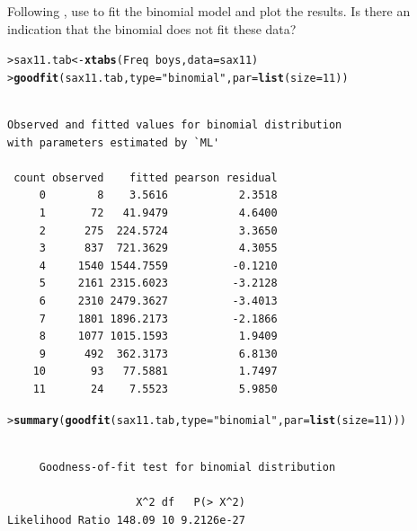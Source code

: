 \documentclass[10pt]{report}\usepackage[]{graphicx}\usepackage[]{color}
\makeatletter
\newcommand{\hlnum}[1]{\textcolor[rgb]{0.686,0.059,0.569}{#1}}%
\newcommand{\hlstr}[1]{\textcolor[rgb]{0.192,0.494,0.8}{#1}}%
\newcommand{\hlopt}[1]{\textcolor[rgb]{0,0,0}{#1}}%
\newcommand{\hlstd}[1]{\textcolor[rgb]{0.345,0.345,0.345}{#1}}%
\newcommand{\hlkwb}[1]{\textcolor[rgb]{0.69,0.353,0.396}{#1}}%
\newcommand{\hlkwc}[1]{\textcolor[rgb]{0.333,0.667,0.333}{#1}}%
\newcommand{\hlkwd}[1]{\textcolor[rgb]{0.737,0.353,0.396}{\textbf{#1}}}%
\newenvironment{kframe}{%
 \def\at@end@of@kframe{}%
 \ifinner\ifhmode%
  \def\at@end@of@kframe{\end{minipage}}%
  \begin{minipage}{\columnwidth}%
 \fi\fi%
 \def\FrameCommand##1{\hskip\@totalleftmargin \hskip-\fboxsep
 \colorbox{shadecolor}{##1}\hskip-\fboxsep
     \hskip-\linewidth \hskip-\@totalleftmargin \hskip\columnwidth}%
 \MakeFramed {\advance\hsize-\width
   \@totalleftmargin\z@ \linewidth\hsize
   \@setminipage}}%
 {\par\unskip\endMakeFramed%
 \at@end@of@kframe}
\newenvironment{knitrout}{}{} %
\renewenvironment{knitrout}{\small\renewcommand{\baselinestretch}{.85}}{} %
\makeatother
\begin{document}
\begin{Exercises}
\begin{enumerate*}
    \item Following , use  to fit the binomial model and plot the
    results.  Is there an indication that the binomial does not fit these data?
    \begin{ans}
\begin{knitrout}\footnotesize
{}\color{fgcolor}\begin{kframe}
\begin{alltt}
\hlstd{> }\hlstd{sax11.tab} \hlkwb{<-} \hlkwd{xtabs}\hlstd{(Freq} \hlopt{~} \hlstd{boys,} \hlkwc{data}\hlstd{=sax11)}
\hlstd{> }\hlkwd{goodfit}\hlstd{(sax11.tab,} \hlkwc{type}\hlstd{=}\hlstr{"binomial"}\hlstd{,} \hlkwc{par}\hlstd{=}\hlkwd{list}\hlstd{(}\hlkwc{size}\hlstd{=}\hlnum{11}\hlstd{))}
\end{alltt}
\begin{verbatim}

Observed and fitted values for binomial distribution
with parameters estimated by `ML' 

 count observed    fitted pearson residual
     0        8    3.5616           2.3518
     1       72   41.9479           4.6400
     2      275  224.5724           3.3650
     3      837  721.3629           4.3055
     4     1540 1544.7559          -0.1210
     5     2161 2315.6023          -3.2128
     6     2310 2479.3627          -3.4013
     7     1801 1896.2173          -2.1866
     8     1077 1015.1593           1.9409
     9      492  362.3173           6.8130
    10       93   77.5881           1.7497
    11       24    7.5523           5.9850
\end{verbatim}
\begin{alltt}
\hlstd{> }\hlkwd{summary}\hlstd{(}\hlkwd{goodfit}\hlstd{(sax11.tab,} \hlkwc{type}\hlstd{=}\hlstr{"binomial"}\hlstd{,} \hlkwc{par}\hlstd{=}\hlkwd{list}\hlstd{(}\hlkwc{size}\hlstd{=}\hlnum{11}\hlstd{)))}
\end{alltt}
\begin{verbatim}

	 Goodness-of-fit test for binomial distribution

                    X^2 df   P(> X^2)
Likelihood Ratio 148.09 10 9.2126e-27
\end{verbatim}
\end{kframe}
\end{knitrout}
    \end{ans}
    

\end{enumerate*}
\end{Exercises}
\end{document}
